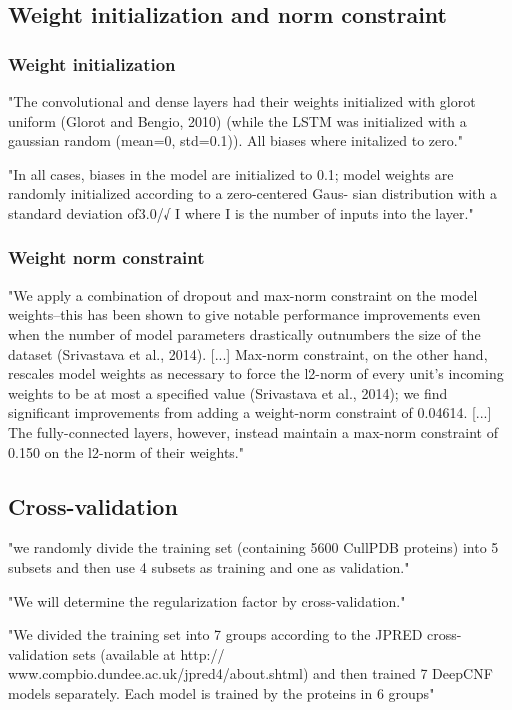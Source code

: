 \documentclass[]{scrartcl}
\begin{document}
\subsection{Weight initialization and norm constraint}
\subsubsection{Weight initialization}
"The convolutional and dense layers had their weights initialized with glorot uniform (Glorot and Bengio, 2010) (while the LSTM was initialized with a gaussian random (mean=0, std=0.1)). All biases where initalized to zero." \cite{Jurtz2017}

"In all cases, biases in the model are initialized to 0.1; model weights are randomly initialized according to a zero-centered Gaus- sian distribution with a standard deviation of3.0/√ I where I is the number of inputs into the layer." \cite{Busia2017}
\subsubsection{Weight norm constraint}
"We apply a combination of dropout and max-norm constraint on the model weights–this has been shown to give notable performance improvements even when the number of model parameters drastically outnumbers the size of the dataset (Srivastava et al., 2014). [...] Max-norm constraint, on the other hand, rescales model weights as necessary to force the l2-norm of every unit’s incoming weights to be at most a specified value (Srivastava et al., 2014); we find significant improvements from adding a weight-norm constraint of 0.04614. [...] The fully-connected layers, however, instead maintain a max-norm constraint of 0.150 on the l2-norm of their weights." \cite{Busia2017}

\subsection{Cross-validation}
"we randomly divide the training set (containing 5600 CullPDB proteins) into 5 subsets and then use 4 subsets as training and one as validation." \cite{Wang2016}

"We will determine the regularization factor by cross-validation." \cite{Wang2016}

"We divided the training set into 7 groups according to the JPRED cross-validation sets (available at http:// www.compbio.dundee.ac.uk/jpred4/about.shtml) and then trained 7 DeepCNF models separately. Each model is trained by the proteins in 6 groups" \cite{Wang2016}
\end{document}
